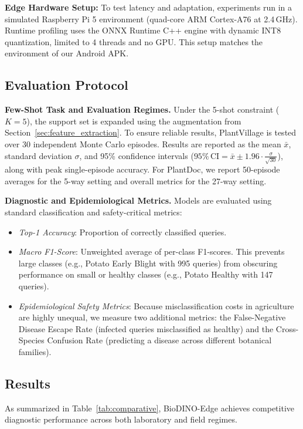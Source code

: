 \documentclass[conference]{IEEEtran}
\begin{document}
\textbf{Edge Hardware Setup:} To test latency and adaptation, experiments run in a simulated Raspberry Pi 5 environment (quad-core ARM Cortex-A76 at 2.4\,GHz). Runtime profiling uses the ONNX Runtime C++ engine with dynamic INT8 quantization, limited to 4 threads and no GPU. This setup matches the environment of our Android APK.

\subsection{Evaluation Protocol}
\label{sec:eval_protocol}
\textbf{Few-Shot Task and Evaluation Regimes.} Under the 5-shot constraint ($K=5$), the support set is expanded using the augmentation from Section~\ref{sec:feature_extraction}. To ensure reliable results, PlantVillage is tested over 30 independent Monte Carlo episodes. Results are reported as the mean $\bar{x}$, standard deviation $\sigma$, and 95\% confidence intervals ($95\%\,\text{CI} = \bar{x} \pm 1.96 \cdot \frac{\sigma}{\sqrt{30}}$), along with peak single-episode accuracy. For PlantDoc, we report 50-episode averages for the 5-way setting and overall metrics for the 27-way setting.

\textbf{Diagnostic and Epidemiological Metrics.} Models are evaluated using standard classification and safety-critical metrics:
\begin{itemize}\setlength{\itemsep}{1pt plus 0.5pt}\setlength{\parsep}{0pt}
    \item \textit{Top-1 Accuracy}: Proportion of correctly classified queries.
    \item \textit{Macro F1-Score}: Unweighted average of per-class F1-scores. This prevents large classes (e.g., Potato Early Blight with 995 queries) from obscuring performance on small or healthy classes (e.g., Potato Healthy with 147 queries).
    \item \textit{Epidemiological Safety Metrics}: Because misclassification costs in agriculture are highly unequal, we measure two additional metrics: the False-Negative Disease Escape Rate (infected queries misclassified as healthy) and the Cross-Species Confusion Rate (predicting a disease across different botanical families).
\end{itemize}

\subsection{Results}
\label{sec:main_results}
As summarized in Table~\ref{tab:comparative}, BioDINO-Edge achieves competitive diagnostic performance across both laboratory and field regimes.
\end{document}
